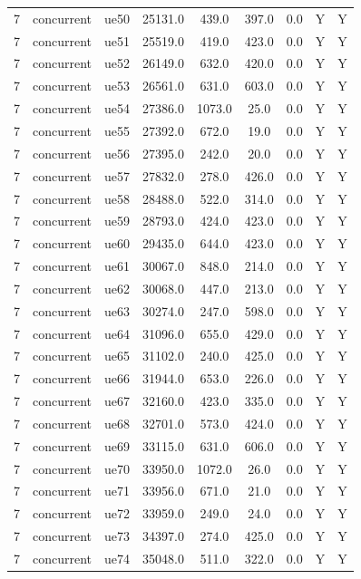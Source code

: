 \begin{table}[ht]
\begin{tabular}{|c|c|c|c|c|c|c|c|c|}
7 & concurrent & ue50 & 25131.0 & 439.0 & 397.0 & 0.0 & Y & Y \\
7 & concurrent & ue51 & 25519.0 & 419.0 & 423.0 & 0.0 & Y & Y \\
7 & concurrent & ue52 & 26149.0 & 632.0 & 420.0 & 0.0 & Y & Y \\
7 & concurrent & ue53 & 26561.0 & 631.0 & 603.0 & 0.0 & Y & Y \\
7 & concurrent & ue54 & 27386.0 & 1073.0 & 25.0 & 0.0 & Y & Y \\
7 & concurrent & ue55 & 27392.0 & 672.0 & 19.0 & 0.0 & Y & Y \\
7 & concurrent & ue56 & 27395.0 & 242.0 & 20.0 & 0.0 & Y & Y \\
7 & concurrent & ue57 & 27832.0 & 278.0 & 426.0 & 0.0 & Y & Y \\
7 & concurrent & ue58 & 28488.0 & 522.0 & 314.0 & 0.0 & Y & Y \\
7 & concurrent & ue59 & 28793.0 & 424.0 & 423.0 & 0.0 & Y & Y \\
7 & concurrent & ue60 & 29435.0 & 644.0 & 423.0 & 0.0 & Y & Y \\
7 & concurrent & ue61 & 30067.0 & 848.0 & 214.0 & 0.0 & Y & Y \\
7 & concurrent & ue62 & 30068.0 & 447.0 & 213.0 & 0.0 & Y & Y \\
7 & concurrent & ue63 & 30274.0 & 247.0 & 598.0 & 0.0 & Y & Y \\
7 & concurrent & ue64 & 31096.0 & 655.0 & 429.0 & 0.0 & Y & Y \\
7 & concurrent & ue65 & 31102.0 & 240.0 & 425.0 & 0.0 & Y & Y \\
7 & concurrent & ue66 & 31944.0 & 653.0 & 226.0 & 0.0 & Y & Y \\
7 & concurrent & ue67 & 32160.0 & 423.0 & 335.0 & 0.0 & Y & Y \\
7 & concurrent & ue68 & 32701.0 & 573.0 & 424.0 & 0.0 & Y & Y \\
7 & concurrent & ue69 & 33115.0 & 631.0 & 606.0 & 0.0 & Y & Y \\
7 & concurrent & ue70 & 33950.0 & 1072.0 & 26.0 & 0.0 & Y & Y \\
7 & concurrent & ue71 & 33956.0 & 671.0 & 21.0 & 0.0 & Y & Y \\
7 & concurrent & ue72 & 33959.0 & 249.0 & 24.0 & 0.0 & Y & Y \\
7 & concurrent & ue73 & 34397.0 & 274.0 & 425.0 & 0.0 & Y & Y \\
7 & concurrent & ue74 & 35048.0 & 511.0 & 322.0 & 0.0 & Y & Y \\

\end{tabular}
\end{table}
